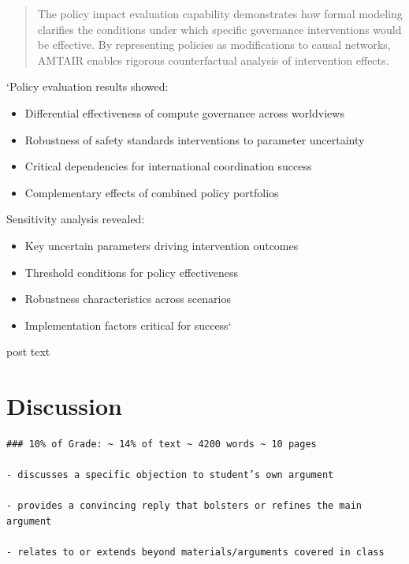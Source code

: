 \documentclass[
  11pt,
  letterpaper,
]{book}
\providecommand{\tightlist}{%
  \setlength{\itemsep}{0pt}\setlength{\parskip}{0pt}}
\begin{document}
\begin{quote}
The policy impact evaluation capability demonstrates how formal modeling
clarifies the conditions under which specific governance interventions
would be effective. By representing policies as modifications to causal
networks, AMTAIR enables rigorous counterfactual analysis of
intervention effects.
\end{quote}

`Policy evaluation results showed:

\begin{itemize}
\tightlist
\item
  Differential effectiveness of compute governance across worldviews
\item
  Robustness of safety standards interventions to parameter uncertainty
\item
  Critical dependencies for international coordination success
\item
  Complementary effects of combined policy portfolios
\end{itemize}

Sensitivity analysis revealed:

\begin{itemize}
\tightlist
\item
  Key uncertain parameters driving intervention outcomes
\item
  Threshold conditions for policy effectiveness
\item
  Robustness characteristics across scenarios
\item
  Implementation factors critical for success`
\end{itemize}

post text


\chapter{Discussion}\label{discussion}

\begin{verbatim}
### 10% of Grade: ~ 14% of text ~ 4200 words ~ 10 pages

- discusses a specific objection to student’s own argument

- provides a convincing reply that bolsters or refines the main argument

- relates to or extends beyond materials/arguments covered in class
\end{verbatim}
\end{document}
